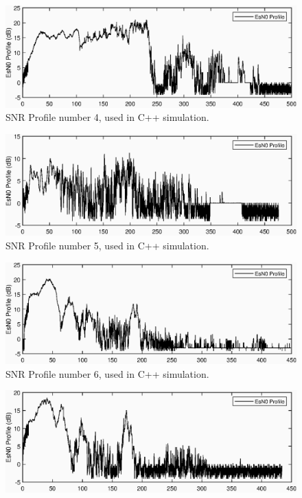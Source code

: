 \begin{appendices}
\begin{figure}[ht!]
\includegraphics{figures/c_sim_snr/EsNo_profile_4.eps}
\caption{SNR Profile number 4, used in C++ simulation.}
\end{figure}
\begin{figure}[ht!]
\includegraphics{figures/c_sim_snr/EsNo_profile_5.eps}
\caption{SNR Profile number 5, used in C++ simulation.}
\end{figure}
\begin{figure}[ht!]
\includegraphics{figures/c_sim_snr/EsNo_profile_6.eps}
\caption{SNR Profile number 6, used in C++ simulation.}
\end{figure}
\begin{figure}[ht!]
\includegraphics{figures/c_sim_snr/EsNo_profile_7.eps}

\end{figure}
\end{appendices}
